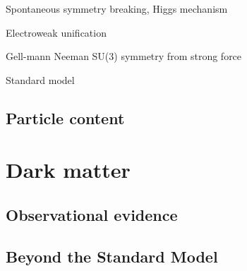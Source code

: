 \indent Spontaneous symmetry breaking, Higgs mechanism

\indent Electroweak unification

\indent Gell-mann Neeman SU(3) symmetry from strong force
 
\indent Standard model

\subsection{Particle content}



\section{Dark matter}

\subsection{Observational evidence}

\subsection{Beyond the Standard Model}

\cite{Carpenter:2013xra}
\cite{Gibaldi:80}
